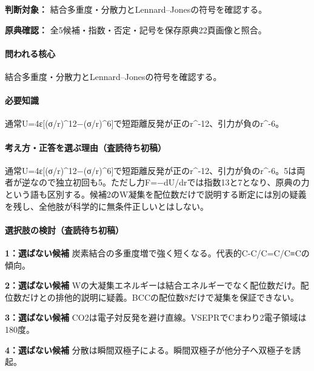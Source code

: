 \noindent\textbf{判断対象：} 結合多重度・分散力とLennard–Jonesの符号を確認する。\par

\noindent\textbf{原典確認：} 全5候補・指数・否定・記号を保存原典22頁画像と照合。\par

\paragraph{問われる核心} 結合多重度・分散力とLennard–Jonesの符号を確認する。

\paragraph{必要知識} 通常U=\allowbreak{}4ε[(σ/r)\textasciicircum{}12−(σ/r)\textasciicircum{}6]で短距離反発が正のr\textasciicircum{}-12、引力が負のr\textasciicircum{}-6。

\paragraph{考え方・正答を選ぶ理由（査読待ち初稿）} 通常U=\allowbreak{}4ε[(σ/r)\textasciicircum{}12−(σ/r)\textasciicircum{}6]で短距離反発が正のr\textasciicircum{}-12、引力が負のr\textasciicircum{}-6。5は両者が逆なので独立初回も5。ただし力F=−dU/drでは指数13と7となり、原典の力という語も区別する。候補2のW凝集を配位数だけで説明する断定には別の疑義を残し、全他肢が科学的に無条件正しいとはしない。

\paragraph{選択肢の検討（査読待ち初稿）}\mbox{}\par

\noindent\textbf{1：選ばない候補} 炭素結合の多重度増で強く短くなる。代表的C-C/C=\allowbreak{}C/C≡Cの傾向。\par

\noindent\textbf{2：選ばない候補} Wの大凝集エネルギーは結合エネルギーでなく配位数だけ。配位数だけとの排他的説明に疑義。BCCの配位数8だけで凝集を保証できない。\par

\noindent\textbf{3：選ばない候補} CO2は電子対反発を避け直線。VSEPRでCまわり2電子領域は180度。\par

\noindent\textbf{4：選ばない候補} 分散は瞬間双極子による。瞬間双極子が他分子へ双極子を誘起。\par

